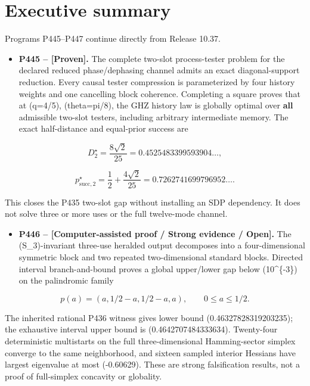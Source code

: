 \documentclass[11pt,a4paper,openany]{report}
\newcommand{\statusProven}{\textcolor{fingreen}{[Proven]}}
\begin{document}
\chapter{Executive summary}

Programs P445--P447 continue directly from Release 10.37.

\begin{itemize}
\item 
\textbf{P445 -- \statusProven{}.} The complete two-slot process-tester problem for the declared reduced phase/\allowbreak{}dephasing channel admits an exact diagonal-support reduction. Every causal tester compression is parameterized by four history weights and one cancelling block coherence. Completing a square proves that at (q=4/\allowbreak{}5), (theta=pi/\allowbreak{}8), the GHZ history law is globally optimal over \textbf{all} admissible two-slot testers, including arbitrary intermediate memory. The exact half-distance and equal-prior success are

\end{itemize}

\[
D_2^\star=\frac{8\sqrt2}{25}
=0.4525483399593904\ldots,
\]

\[
p_{\mathrm{succ},2}^\star
=\frac12+\frac{4\sqrt2}{25}
=0.7262741699796952\ldots.
\]

This closes the P435 two-slot gap without installing an SDP dependency. It does not solve three or more uses or the full twelve-mode channel.

\begin{itemize}
\item 
\textbf{P446 -- [Computer-assisted proof /\allowbreak{} Strong evidence /\allowbreak{} Open].} The (S\_3)-invariant three-use heralded output decomposes into a four-dimensional symmetric block and two repeated two-dimensional standard blocks. Directed interval branch-and-bound proves a global upper/\allowbreak{}lower gap below (10\textasciicircum{}\{-3\}) on the palindromic family

\end{itemize}

\[
p(a)=(a,1/2-a,1/2-a,a),\qquad0\le a\le1/2.
\]

The inherited rational P436 witness gives lower bound (0.46327828319203235); the exhaustive interval upper bound is (0.4642707484333634). Twenty-four deterministic multistarts on the full three-dimensional Hamming-sector simplex converge to the same neighborhood, and sixteen sampled interior Hessians have largest eigenvalue at most (-0.60629). These are strong falsification results, not a proof of full-simplex concavity or globality.
\end{document}
